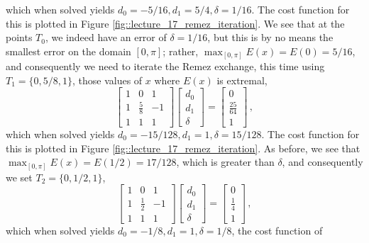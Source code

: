 \begin{exmp}
  which when solved yields $d_0 = -5/16, d_1 = 5/4, \delta = 1/16$. The
  cost function for this is plotted in Figure
  \ref{fig::lecture_17_remez_iteration}. We see that at the
  points $T_0$, we indeed have an error of $\delta = 1/16$, but this is
  by no means the smallest error on the domain $[0,\pi]$; rather,
  $\max_{[0,\pi]}E(x) = E(0) = 5/16$, and consequently we need to iterate
  the Remez exchange, this time using $T_1 = \{0, 5/8, 1\}$, those values of
  $x$ where $E(x)$ is extremal,
  \begin{displaymath}
    \left[\begin{array}{ccc}
        1 & 0 & 1 \\
        1 & \frac{5}{8} & -1 \\
        1 & 1 & 1
      \end{array}\right]
    \left[\begin{array}{c}d_0 \\ d_1 \\ \delta \end{array}\right]
    = \left[\begin{array}{c}0 \\ \frac{25}{64} \\ 1\end{array}\right] \,,  
  \end{displaymath}
  which when solved yields $d_0 = -15/128, d_1 =1, \delta =15/128$. The
  cost function for this is plotted in Figure \ref{fig::lecture_17_remez_iteration}.
  As before, we see
  that $\max_{[0,\pi]}E(x) = E(1/2) = 17/128$, which is greater than
  $\delta$, and consequently we set $T_2 = \{0, 1/2, 1\}$,
  \begin{displaymath}
    \left[\begin{array}{ccc}
        1 & 0 & 1 \\
        1 & \frac{1}{2} & -1 \\
        1 & 1 & 1
      \end{array}\right]
    \left[\begin{array}{c}d_0 \\ d_1 \\ \delta \end{array}\right]
    = \left[\begin{array}{c}0 \\ \frac{1}{4} \\ 1\end{array}\right] \,,  
  \end{displaymath}
  which when solved yields $d_0 = -1/8, d_1 = 1, \delta = 1/8$, the cost function of

\end{exmp}
